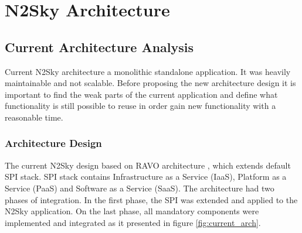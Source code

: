 \section{N2Sky Architecture}\label{TheN2SkyArchitecture}

\subsection{Current Architecture Analysis}\label{CurrentArchitectureAnalysis}

Current N2Sky architecture a monolithic standalone application. It was heavily maintainable and not scalable. Before proposing the new architecture design it is important to find the weak parts of the current application and define what functionality is still possible to reuse in order gain new functionality with a reasonable time.

\subsubsection{Architecture Design}\label{Architecturedesign}

The current N2Sky design based on RAVO architecture \cite{ravo}, which extends default SPI stack. SPI stack contains Infrastructure as a Service (IaaS), Platform as a Service (PaaS) and Software as a Service (SaaS). The architecture had two phases of integration.  In the first phase, the SPI was extended and applied to the N2Sky application. On the last phase, all mandatory components were implemented and integrated as it presented in figure \ref{fig:current_arch}.

